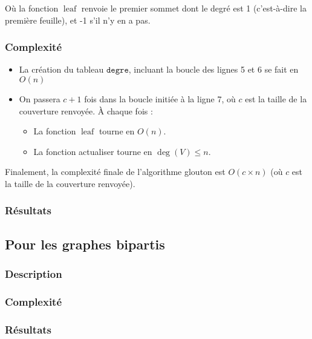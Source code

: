 \documentclass[a4paper,10pt]{article}
\newcommand*{\itemb}{\item[$\bullet$]}
\newcommand*{\itemt}{\item[$\blacktriangleright$]}
\DeclareMathOperator{\leaf}{leaf}
\begin{document}
Où la fonction $\leaf$ renvoie le premier sommet dont le degré est 1 (c'est-à-dire la première feuille), et -1 s'il n'y en a pas.

\subsubsection{Complexité}

\begin{itemize}
 \itemb La création du tableau $\mathtt{degre}$, incluant la boucle des lignes 5 et 6 se fait en $O(n)$
 \itemb On passera $c+1$ fois dans la boucle initiée à la ligne 7, où $c$ est la taille de la couverture renvoyée. À chaque fois :
\begin{itemize}
\itemt La fonction $\leaf$ tourne en $O(n)$.
\itemt La fonction actualiser tourne en $\deg(V)\leqslant n$.
\end{itemize}
\end{itemize}

Finalement, la complexité finale de l'algorithme glouton est $O(c\times n)$ (où $c$ est la taille de la couverture renvoyée).

\subsubsection{Résultats}

\subsection{Pour les graphes bipartis}

\subsubsection{Description}


\subsubsection{Complexité}


\subsubsection{Résultats}
\end{document}
